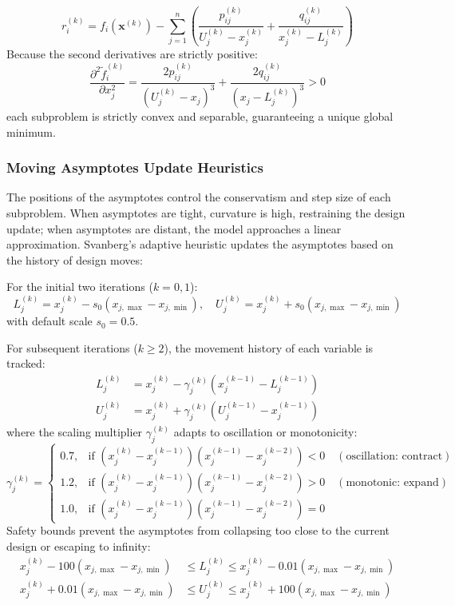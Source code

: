 \documentclass[11pt, a4paper]{article}
\begin{document}
\begin{equation}
r_i^{(k)} = f_i\left(\mathbf{x}^{(k)}\right) - \sum_{j=1}^n \left( \frac{p_{ij}^{(k)}}{U_j^{(k)} - x_j^{(k)}} + \frac{q_{ij}^{(k)}}{x_j^{(k)} - L_j^{(k)}} \right)
\end{equation}
Because the second derivatives are strictly positive:
\begin{equation}
\frac{\partial^2 \tilde{f}_i^{(k)}}{\partial x_j^2} = \frac{2 p_{ij}^{(k)}}{(U_j^{(k)} - x_j)^3} + \frac{2 q_{ij}^{(k)}}{(x_j - L_j^{(k)})^3} > 0
\end{equation}
each subproblem is strictly convex and separable, guaranteeing a unique global minimum.

\subsubsection{Moving Asymptotes Update Heuristics}
The positions of the asymptotes control the conservatism and step size of each subproblem. When asymptotes are tight, curvature is high, restraining the design update; when asymptotes are distant, the model approaches a linear approximation. Svanberg's adaptive heuristic updates the asymptotes based on the history of design moves:

For the initial two iterations ($k=0, 1$):
\begin{equation}
L_j^{(k)} = x_j^{(k)} - s_0 (x_{j, \max} - x_{j, \min}), \quad U_j^{(k)} = x_j^{(k)} + s_0 (x_{j, \max} - x_{j, \min})
\end{equation}
with default scale $s_0 = 0.5$.

For subsequent iterations ($k \ge 2$), the movement history of each variable is tracked:
\begin{align}
L_j^{(k)} &= x_j^{(k)} - \gamma_j^{(k)} \left( x_j^{(k-1)} - L_j^{(k-1)} \right) \\
U_j^{(k)} &= x_j^{(k)} + \gamma_j^{(k)} \left( U_j^{(k-1)} - x_j^{(k-1)} \right)
\end{align}
where the scaling multiplier $\gamma_j^{(k)}$ adapts to oscillation or monotonicity:
\begin{equation}
\gamma_j^{(k)} = \begin{cases}
0.7, & \text{if } \left( x_j^{(k)} - x_j^{(k-1)} \right)\left( x_j^{(k-1)} - x_j^{(k-2)} \right) < 0 \quad (\text{oscillation: contract}) \\[4pt]
1.2, & \text{if } \left( x_j^{(k)} - x_j^{(k-1)} \right)\left( x_j^{(k-1)} - x_j^{(k-2)} \right) > 0 \quad (\text{monotonic: expand}) \\[4pt]
1.0, & \text{if } \left( x_j^{(k)} - x_j^{(k-1)} \right)\left( x_j^{(k-1)} - x_j^{(k-2)} \right) = 0
\end{cases}
\end{equation}
Safety bounds prevent the asymptotes from collapsing too close to the current design or escaping to infinity:
\begin{align}
x_j^{(k)} - 100(x_{j, \max} - x_{j, \min}) &\le L_j^{(k)} \le x_j^{(k)} - 0.01(x_{j, \max} - x_{j, \min}) \\
x_j^{(k)} + 0.01(x_{j, \max} - x_{j, \min}) &\le U_j^{(k)} \le x_j^{(k)} + 100(x_{j, \max} - x_{j, \min})
\end{align}
\end{document}
